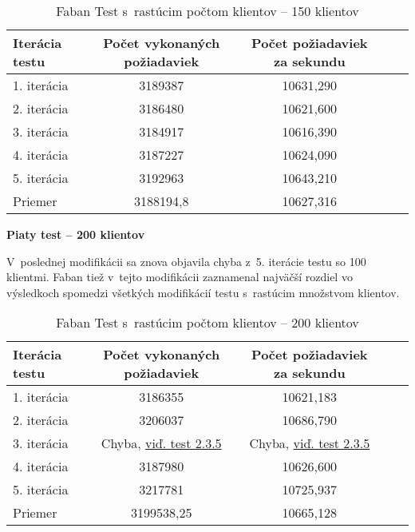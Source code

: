 \documentclass[12pt,oneside,final]{fithesis-utf8}
\begin{document}
\begin{itemize}
\begin{table}[H]
\begin{center}
\begin{tabular}{ | l | c | c | c | c |}
		\hline
		 \textbf{Iterácia testu} & \textbf{Počet vykonaných požiadaviek} & \textbf{Počet požiadaviek za sekundu} \\ \hline
		 1. iterácia & 3189387 & 10631,290 \\ \hline
		 2. iterácia & 3186480 & 10621,600 \\ \hline
		 3. iterácia & 3184917 & 10616,390 \\ \hline
		 4. iterácia & 3187227 & 10624,090 \\ \hline
		 5. iterácia & 3192963 & 10643,210 \\ \hline
		 Priemer & 3188194,8 & 10627,316 \\ \hline
		 
\end{tabular}
\end{center}
\caption{Faban Test s~rastúcim počtom klientov -- 150 klientov}
\end{table}

\textbf{Piaty test -- 200 klientov}

V~poslednej modifikácii sa znova objavila chyba z~5. iterácie testu so 100 klientmi. Faban tiež v~tejto modifikácii zaznamenal najväčší rozdiel vo výsledkoch spomedzi všetkých modifikácií testu s~rastúcim množstvom klientov.

\begin{table}[h!]
\begin{center}
\begin{tabular}{ | l | c | c | c | c |}
		\hline
		 \textbf{Iterácia testu} & \textbf{Počet vykonaných požiadaviek} & \textbf{Počet požiadaviek za sekundu} \\ \hline
		 1. iterácia & 3186355 & 10621,183 \\ \hline
		 2. iterácia & 3206037 & 10686,790 \\ \hline
 		 3. iterácia & Chyba, \hyperlink{label}{viď. test 2.3.5} & Chyba, \hyperlink{label}{viď. test 2.3.5}  \\ \hline
		 4. iterácia & 3187980 & 10626,600 \\ \hline
		 5. iterácia & 3217781 & 10725,937 \\ \hline
		 Priemer & 3199538,25 & 10665,128 \\ \hline
		 
\end{tabular}
\end{center}
\caption{Faban Test s~rastúcim počtom klientov -- 200 klientov}
\end{table}



\end{itemize}
\end{document}
